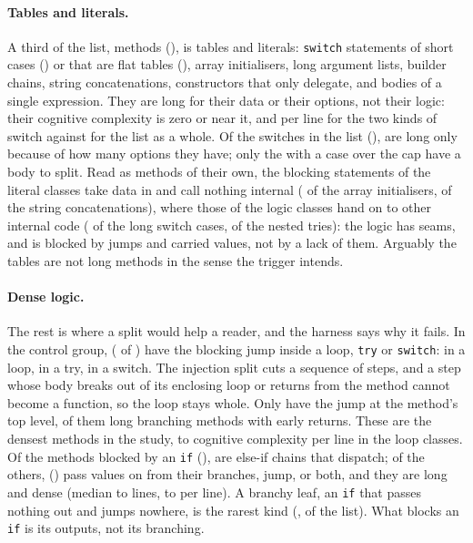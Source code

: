 \documentclass[11pt,a4paper]{article}
\newcommand{\sig}[1]{\texttt{#1}}
\begin{document}
\paragraph{Tables and literals.} A third of the list, \exTables{} methods
(\exTablesShare{}), is tables and literals: \sig{switch} statements of short
cases (\exSwitchShort{}) or that are flat tables (\exSwitchFlat{}), array
initialisers, long argument lists, builder chains, string concatenations,
constructors that only delegate, and bodies of a single expression. They are
long for their data or their options, not their logic: their cognitive
complexity is zero or near it, \exCogPerLineFlat{} and \exCogPerLineShort{}
per line for the two kinds of switch against \exCogPerLineCatFour{} for the
list as a whole. Of the \exSwitches{} switches in the list
(\exSwitchesShare{}), \exSwitchOptions{} are long only because of how many
options they have; only the \exSwitchCaseOver{} with a case over the cap
have a body to split. Read as methods of their own, the blocking statements
of the literal classes take data in and call nothing internal
(\exLitCatchmentArray{} of the array initialisers, \exLitCatchmentConcat{}
of the string concatenations), where those of the logic classes hand on to
other internal code (\exLogicJunctionCase{} of the long switch cases,
\exLogicJunctionTry{} of the nested tries): the logic has seams, and is
blocked by jumps and carried values, not by a lack of them. Arguably the
tables are not long methods in the sense the trigger intends.

\paragraph{Dense logic.} The rest is where a split would help a reader, and
the harness says why it fails. In the control group,
\exControlContainedShare{} (\exControlContained{} of \exControl{}) have the
blocking jump inside a loop, \sig{try} or \sig{switch}: \exControlLoop{} in a
loop, \exControlTry{} in a try, \exControlSwitch{} in a switch. The injection
split cuts a sequence of steps, and a step whose body breaks out of its
enclosing loop or returns from the method cannot become a function, so the
loop stays whole. Only \exControlTop{} have the jump at the method's top
level, \exControlTopReturn{} of them long branching methods with early
returns. These are the densest methods in the study, \exCogPerLineLoopLo{}
to \exCogPerLineLoopHi{} cognitive complexity per line in the loop classes.
Of the \exIfs{} methods blocked by an \sig{if} (\exIfsShare{}),
\exIfDispatch{} are else-if chains that dispatch; of the \exIfNonDispatch{}
others, \exIfPassOrJump{} (\exIfPassOrJumpShare{}) pass values on from their
branches, jump, or both, and they are long and dense (median
\exIfDenseLengthLo{} to \exIfDenseLengthHi{} lines, \exIfDenseCplLo{} to
\exIfDenseCplHi{} per line). A branchy leaf, an \sig{if} that passes nothing
out and jumps nowhere, is the rarest kind (\exIfLeaf{}, \exIfLeafShare{} of
the list). What blocks an \sig{if} is its outputs, not its branching.
\end{document}

